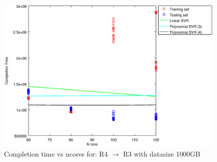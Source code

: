 
\begin {figure}[hbtp]
\centering
\includegraphics[width=\textwidth]{output/R4_R3_1000_ALL_FEATURES/plot_R4_R3_1000_bestmodels.eps}
\caption{Completion time vs ncores for: R4 $\rightarrow$ R3 with datasize 1000GB}
\label{fig:coreonly_linear_R4_R3_1000}
\end {figure}
